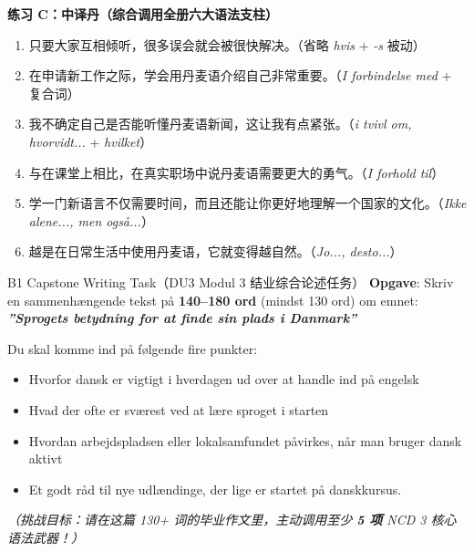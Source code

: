 \textbf{练习 C：中译丹（综合调用全册六大语法支柱）}
\begin{enumerate}
  \item 只要大家互相倾听，很多误会就会被很快解决。（省略 \textit{hvis} + \textit{-s} 被动）
  \item 在申请新工作之际，学会用丹麦语介绍自己非常重要。（\textit{I forbindelse med} + 复合词）
  \item 我不确定自己是否能听懂丹麦语新闻，这让我有点紧张。（\textit{i tvivl om, hvorvidt...} + \textit{hvilket}）
  \item 与在课堂上相比，在真实职场中说丹麦语需要更大的勇气。（\textit{I forhold til}）
  \item 学一门新语言不仅需要时间，而且还能让你更好地理解一个国家的文化。（\textit{Ikke alene..., men også...}）
  \item 越是在日常生活中使用丹麦语，它就变得越自然。（\textit{Jo..., desto...}）
\end{enumerate}


\begin{emailbox}{B1 Capstone Writing Task（DU3 Modul 3 结业综合论述任务）}
\textbf{Opgave}: Skriv en sammenhængende tekst på \textbf{140--180 ord} (mindst 130 ord) om emnet:\newline
\textbf{\textit{”Sprogets betydning for at finde sin plads i Danmark”}}

Du skal komme ind på følgende fire punkter:
\begin{itemize}
  \item Hvorfor dansk er vigtigt i hverdagen ud over at handle ind på engelsk
  \item Hvad der ofte er sværest ved at lære sproget i starten
  \item Hvordan arbejdspladsen eller lokalsamfundet påvirkes, når man bruger dansk aktivt
  \item Et godt råd til nye udlændinge, der lige er startet på danskkursus.
\end{itemize}
\textit{（挑战目标：请在这篇 130+ 词的毕业作文里，主动调用至少 \textbf{5 项} NCD 3 核心语法武器！）}
\end{emailbox}

